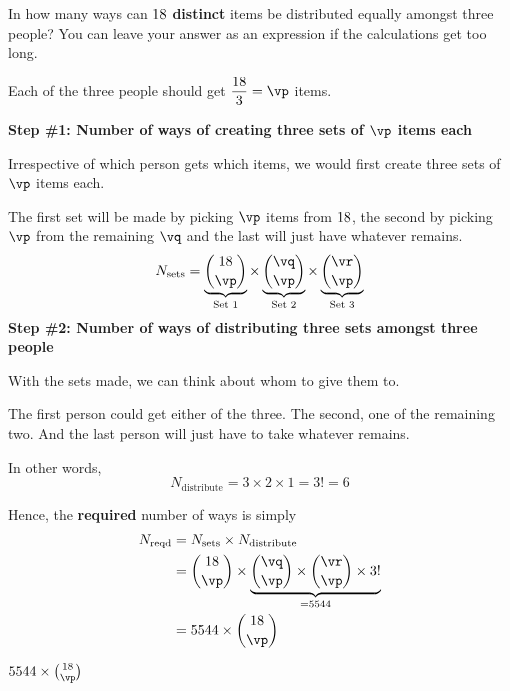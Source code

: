 



\DIVIDE{}\vp
\SUBTRACT\vn\vp\vq
\SUBTRACT\vq\vp\vr

\question[4] In how many ways can $18$ \textbf{distinct} items be distributed 
equally amongst three people? You can leave your answer as an expression if 
the calculations get too long.

\watchout

\begin{solution}[\halfpage]
  Each of the three people should get $\dfrac\vn{3}=\vp$ items. 

  \textbf{Step \#1: Number of ways of creating three sets of $\vp$ items each}

  Irrespective of which person gets which items, we would first create three sets 
  of $\vp$ items each. 

  The first set will be made by picking $\vp$ items from $18$, the second by picking $\vp$ from 
  the remaining $\vq$ and the last will just have whatever remains. 
  \[ N_{\text{sets}} = \underbrace{\binom\vn\vp}_{\text{Set 1}}\times
  \underbrace{\binom\vq\vp}_{\text{Set 2}}\times
  \underbrace{\binom\vr\vp}_{\text{Set 3}} \]
  \textbf{Step \#2: Number of ways of distributing three sets amongst three people} 

  With the sets made, we can think about whom to give them to. 

  The first person could get either of the three. The second, one of the remaining two. 
  And the last person will just have to take whatever remains. 

  In other words, 
  \[ N_{\text{distribute}} = 3\times 2\times 1 = 3! = 6 \] 

  Hence, the \textbf{required} number of ways is simply 
  \begin{align}
    N_{\text{reqd}} &= N_{\text{sets}}\times N_{\text{distribute}} \\
        &= \binom\vn\vp\times\underbrace{\binom\vq\vp\times\binom\vr\vp\times 3!}_{=\vz} \\
        &= \vz\times\binom\vn\vp
  \end{align}

\end{solution}
\ifprintanswers\begin{codex}$\vz\times\binom\vn\vp$\end{codex}\fi
